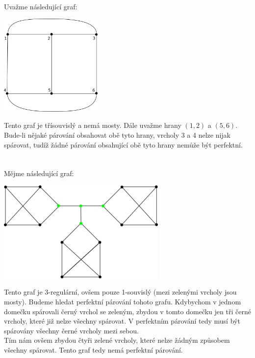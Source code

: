 \documentclass{scrartcl}
\begin{document}
    \section{}
        Uvažme následující graf:
        \begin{center}
            \includegraphics[height=5cm]{Graph1}
        \end{center}

        Tento graf je třísouvislý a nemá mosty. Dále uvažme hrany $(1,2)$ a $(5,6)$. Bude-li nějaké párování obsahovat obě tyto hrany, vrcholy 3 a 4 nelze nijak spárovat, tudíž žádné párování obsahující obě tyto hrany nemůže být perfektní.

    \section{}
        Mějme následující graf:
        \begin{center}
            \includegraphics[height=5cm]{Graph2}
        \end{center}

        Tento graf je 3-regulární, ovšem pouze 1-souvislý (mezi zelenými vrcholy jsou mosty). Budeme hledat perfektní párování tohoto grafu. Kdybychom v jednom domečku spárovali černý vrchol se zeleným, zbydou v tomto domečku jen tři černé vrcholy, které již nelze všechny spárovat. V perfektním párování tedy musí být spárovány všechny černé vrcholy mezi sebou. \\

        Tím nám ovšem zbydou čtyři zelené vrcholy, které nelze žádným způsobem všechny spárovat. Tento graf tedy nemá perfektní párování.
    
\end{document}

